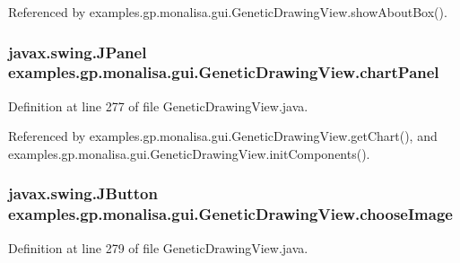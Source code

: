 Referenced by examples.\-gp.\-monalisa.\-gui.\-Genetic\-Drawing\-View.\-show\-About\-Box().

\hypertarget{classexamples_1_1gp_1_1monalisa_1_1gui_1_1_genetic_drawing_view_abebee5fc36d5edc0a4528d0a3a6a3809}{
\subsubsection[{chart\-Panel}]{\setlength{\rightskip}{0pt plus 5cm}javax.\-swing.\-J\-Panel examples.\-gp.\-monalisa.\-gui.\-Genetic\-Drawing\-View.\-chart\-Panel\hspace{0.3cm}{\ttfamily [private]}}}\label{classexamples_1_1gp_1_1monalisa_1_1gui_1_1_genetic_drawing_view_abebee5fc36d5edc0a4528d0a3a6a3809}


Definition at line 277 of file Genetic\-Drawing\-View.\-java.



Referenced by examples.\-gp.\-monalisa.\-gui.\-Genetic\-Drawing\-View.\-get\-Chart(), and examples.\-gp.\-monalisa.\-gui.\-Genetic\-Drawing\-View.\-init\-Components().

\hypertarget{classexamples_1_1gp_1_1monalisa_1_1gui_1_1_genetic_drawing_view_aa85940d38039230df5f2fa874777cd5e}{
\subsubsection[{choose\-Image}]{\setlength{\rightskip}{0pt plus 5cm}javax.\-swing.\-J\-Button examples.\-gp.\-monalisa.\-gui.\-Genetic\-Drawing\-View.\-choose\-Image\hspace{0.3cm}{\ttfamily [private]}}}\label{classexamples_1_1gp_1_1monalisa_1_1gui_1_1_genetic_drawing_view_aa85940d38039230df5f2fa874777cd5e}


Definition at line 279 of file Genetic\-Drawing\-View.\-java.

